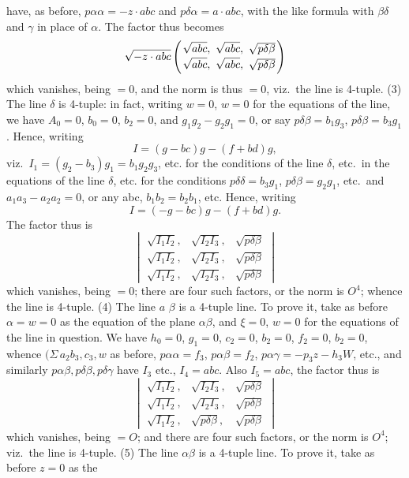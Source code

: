 \documentclass[11pt,a4paper]{book}
\begin{document}
\noindent
have, as before, $p\alpha\alpha = -z\cdot abc$ and $p\delta\alpha = a\cdot abc$, with the like formula with
$\beta\delta$ and $\gamma$ in place of $\alpha$. The factor thus becomes
\[
\sqrt{-z\cdot abc}\left(\sqrt{abc},\ \sqrt{abc},\ \sqrt{p\delta\beta}\atop \sqrt{abc},\ \sqrt{abc},\ \sqrt{p\delta\beta}\right)
\]
which vanishes, being $= 0$, and the norm is thus $= 0$, viz.\ the line is 4-tuple.
\quad(3) The line $\delta$ is 4-tuple: in fact, writing $w = 0$, $w = 0$ for the
equations of the line, we have $A_0 = 0$, $b_0 = 0$, $b_2 = 0$, and $g_1 g_2 - g_2 g_1 = 0$,
or say $p\delta\beta = b_1 g_3$, $p\delta\beta = b_3 g_1$. Hence, writing
\[
I = (g - bc) g - (f + bd) g,
\]
viz.\ $I_1 = (g_2 - b_3) g_1 = b_1 g_2 g_3$, etc. for the conditions of the line $\delta$, etc.\ in the
equations of the line $\delta$, etc. for the conditions $p\delta\delta = b_3 g_1$, $p\delta\beta = g_2 g_1$, etc.\ and $a_1 a_3 - a_2 a_2 = 0$,
or any abc, $b_1 b_2 = b_2 b_1$, etc. Hence, writing
\[
I = (-g - bc)g - (f + bd)g.
\]
The factor thus is
\[
\begin{vmatrix}
\sqrt{I_1 I_2}, & \sqrt{I_2 I_3}, & \sqrt{p\delta\beta} \\
\sqrt{I_1 I_2}, & \sqrt{I_2 I_3}, & \sqrt{p\delta\beta} \\
\sqrt{I_1 I_2}, & \sqrt{I_2 I_3}, & \sqrt{p\delta\beta}
\end{vmatrix}
\]
which vanishes, being $= 0$; there are four such factors, or the norm is $O^4$; whence the line is 4-tuple.
\quad(4) The line $a$ $\beta$ is a 4-tuple line. To prove it, take as before $\alpha = w = 0$ as the
equation of the plane $\alpha\beta$, and $\xi = 0$, $w = 0$ for the equations of
the line in question. We have $h_0 = 0$, $g_1 = 0$, $c_2 = 0$, $b_2 = 0$, $f_2 = 0$, $b_2 = 0$,
whence $(\Sigma\,a_2 b_3, c_3, w$ as before, $p\alpha\alpha = f_3$, $p\alpha\beta = f_2$, $p\alpha\gamma = -p_3 z - h_3 W$, etc., and similarly
$p\alpha\beta, p\delta\beta, p\delta\gamma$ have $I_3$ etc., $I_4 = abc$. Also $I_5 = abc$, the factor thus is
\[
\begin{vmatrix}
\sqrt{I_1 I_2}, & \sqrt{I_2 I_3}, & \sqrt{p\delta\beta} \\
\sqrt{I_1 I_2}, & \sqrt{I_2 I_3}, & \sqrt{p\delta\beta} \\
\sqrt{I_1 I_2}, & \sqrt{p\delta\beta}, & \sqrt{p\delta\beta}
\end{vmatrix}
\]
which vanishes, being $= O$; and there are four such factors, or the norm is $O^4$; viz.\ the line is 4-tuple.
\quad(5) The line $\alpha\beta$ is a 4-tuple line. To prove it, take as before $z = 0$ as the
\end{document}

